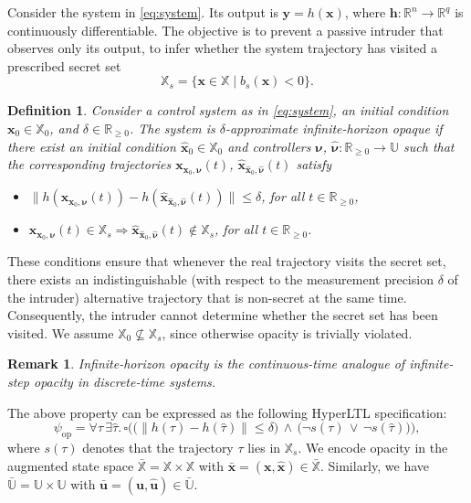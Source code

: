 \documentclass[letterpaper, 10 pt, conference]{ieeeconf}  %
\newtheorem{remark}{Remark}
\newtheorem{definition}{Definition}
\begin{document}
Consider the system in \eqref{eq:system}. Its output is $\mathbf{y} = h(\mathbf{x})$, where $\mathbf{h}: \mathbb{R}^n \rightarrow \mathbb{R}^q$ is continuously differentiable. The objective is to prevent a passive intruder that observes only its output, to infer whether the system trajectory has visited a prescribed secret set
\begin{equation} \label{eq:secret_set}
    \mathbb{X}_s = \{ \mathbf{x} \in \mathbb{X} \mid b_s(\mathbf{x}) < 0 \}.
\end{equation}

\begin{definition} \label{def:security}
    Consider a control system as in \eqref{eq:system}, an initial condition $\mathbf{x}_0 \in \mathbb{X}_0$, and $\delta \in \mathbb{R}_{\ge 0}$. The system is \emph{$\delta$-approximate infinite-horizon opaque} if there exist an initial condition $\hat{\mathbf{x}}_0 \in \mathbb{X}_0$ and controllers $\boldsymbol{\nu}$, $\hat{\boldsymbol{\nu}}: \mathbb{R}_{\ge 0} \rightarrow \mathbb{U}$ such that the corresponding trajectories $\mathbf{x}_{\mathbf{x}_0, \boldsymbol{\nu}}(t)$, $\hat{\mathbf{x}}_{\hat{\mathbf{x}}_0,\hat{\boldsymbol{\nu}}}(t)$ satisfy
    \begin{itemize}
        \item $\| h(\mathbf{x}_{\mathbf{x}_0, \boldsymbol{\nu}}(t)) - h(\hat{\mathbf{x}}_{\hat{\mathbf{x}}_0, \hat{\boldsymbol{\nu}}}(t)) \| \le \delta$, for all $t \in \mathbb{R}_{\ge 0}$,
        \item $\mathbf{x}_{\mathbf{x}_0, \boldsymbol{\nu}}(t) \in \mathbb{X}_s \Rightarrow \hat{\mathbf{x}}_{\hat{\mathbf{x}}_0, \hat{\boldsymbol{\nu}}}(t) \notin \mathbb{X}_s$, for all $t \in \mathbb{R}_{\ge 0}$.
    \end{itemize}
\end{definition}
These conditions ensure that whenever the real trajectory visits the secret set, there exists an indistinguishable (with respect to the measurement precision $\delta$ of the intruder) alternative trajectory that is non-secret at the same time. Consequently, the intruder cannot determine whether the secret set has been visited. We assume $\mathbb{X}_0 \not\subseteq \mathbb{X}_s$, since otherwise opacity is trivially violated.
\begin{remark}
    Infinite-horizon opacity is the continuous-time analogue of infinite-step opacity in discrete-time systems.
\end{remark}
The above property can be expressed as the following HyperLTL specification:
\begin{equation*}
    \psi_{\text{op}} = \forall \tau \, \exists \hat{\tau}. \, \square \Big( \big( \|h(\tau) - h(\hat{\tau})\| \le \delta \big) \, \land \, \big( \neg s(\tau) \, \lor \, \neg s(\hat{\tau}) \big) \Big),
\end{equation*}
where $s(\tau)$ denotes that the trajectory $\tau$ lies in $\mathbb{X}_s$. We encode opacity in the augmented state space $\bar{\mathbb{X}} = \mathbb{X} \times \mathbb{X}$ with $\bar{\mathbf{x}} = (\mathbf{x}, \hat{\mathbf{x}}) \in \bar{\mathbb{X}}$. Similarly, we have $\bar{\mathbb{U}} = \mathbb{U} \times \mathbb{U}$ with $\bar{\mathbf{u}} = (\mathbf{u}, \hat{\mathbf{u}}) \in \bar{\mathbb{U}}$. 
\end{document}
